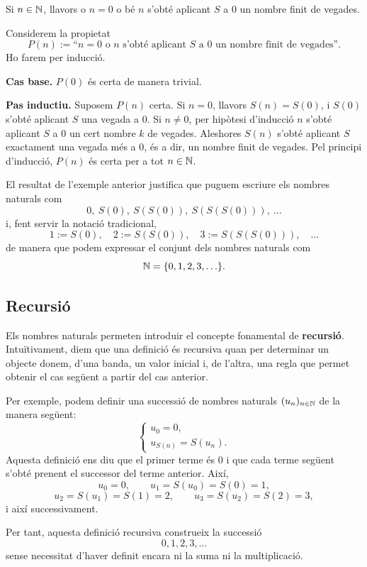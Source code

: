 \begin{exemple}
Si $n\in \mathbb{N}$, llavors o $n=0$ o bé $n$ s'obté aplicant $S$ a $0$ un nombre finit de vegades.
\end{exemple}

\begin{solucio}
Considerem la propietat
\[
P(n):=\text{``$n=0$ o $n$ s'obté aplicant $S$ a $0$ un nombre finit de vegades''.}
\]
Ho farem per inducció.

\textbf{Cas base.} $P(0)$ és certa de manera trivial.

\textbf{Pas inductiu.} Suposem $P(n)$ certa. Si $n=0$, llavors $S(n)=S(0)$, i $S(0)$ s'obté aplicant $S$ una vegada a $0$. Si $n\neq 0$, per hipòtesi d'inducció $n$ s'obté aplicant $S$ a $0$ un cert nombre $k$ de vegades. Aleshores $S(n)$ s'obté aplicant $S$ exactament una vegada més a $0$, és a dir, un nombre finit de vegades. Pel principi d'inducció, $P(n)$ és certa per a tot $n\in \mathbb{N}$.
\end{solucio}

El resultat de l'exemple anterior justifica que puguem escriure els nombres naturals com
\[
0,\ S(0),\ S(S(0)),\ S(S(S(0))),\ \ldots
\]
i, fent servir la notació tradicional,
\[
1:=S(0),\quad 2:=S(S(0)),\quad 3:=S(S(S(0))),\quad \ldots
\]
de manera que podem expressar el conjunt dels nombres naturals com
\[
\mathbb{N}=\{0,1,2,3,\ldots\}.
\]

\subsection{Recursió}

Els nombres naturals permeten introduir el concepte fonamental de \textbf{recursió}. Intuïtivament, diem que una definició és recursiva quan per determinar un objecte donem, d'una banda, un valor inicial i, de l'altra, una regla que permet obtenir el cas següent a partir del cas anterior.

Per exemple, podem definir una successió de nombres naturals $(u_n)_{n\in\mathbb{N}}$ de la manera següent:
\[
\left\{
\begin{array}{l}
u_0=0,\\
u_{S(n)}=S(u_n).
\end{array}
\right.
\]
Aquesta definició ens diu que el primer terme és $0$ i que cada terme següent s'obté prenent el successor del terme anterior. Així,
\[
u_0=0,\qquad
u_1=S(u_0)=S(0)=1,
\]
\[
u_2=S(u_1)=S(1)=2,\qquad
u_3=S(u_2)=S(2)=3,
\]
i així successivament.

Per tant, aquesta definició recursiva construeix la successió
\[
0,1,2,3,\ldots
\]
sense necessitat d'haver definit encara ni la suma ni la multiplicació.

